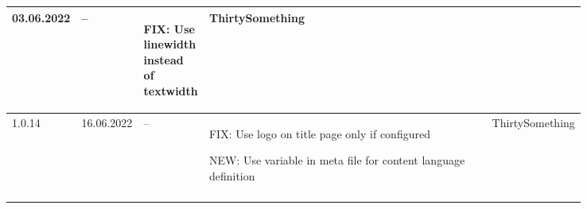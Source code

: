 \begin{tiny}
\begin{longtable}{ | p{0.06\linewidth} | p{0.08\linewidth} | p{0.06\linewidth} | P{0.49\linewidth} | p{0.15\linewidth} | }
        03.06.2022               &
        --                       &
        \begin{tsLTItemize}
            \item FIX: Use linewidth instead of textwidth
        \end{tsLTItemize}
                                 &
        ThirtySomething            \\
        \hline
        1.0.14                   &
        16.06.2022               &
        --                       &
        \begin{tsLTItemize}
            \item FIX: Use logo on title page only if configured
            \item NEW: Use variable in meta file for content language definition
        \end{tsLTItemize}
                                 &
        ThirtySomething            \\
        \hline
    \end{longtable}
\end{tiny}
